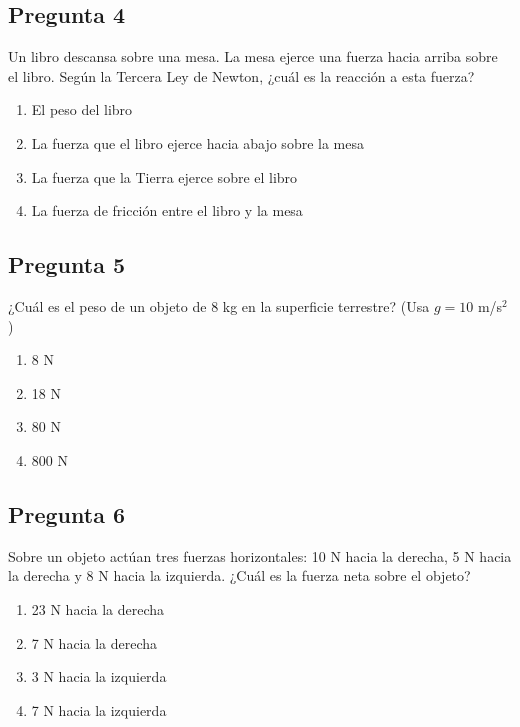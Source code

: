 \begin{preguntabox}
\subsection{Pregunta 4}
Un libro descansa sobre una mesa. La mesa ejerce una fuerza hacia arriba sobre el libro. Según la Tercera Ley de Newton, ¿cuál es la reacción a esta fuerza?

\begin{enumerate}
    \item[A)] El peso del libro
    \item[B)] La fuerza que el libro ejerce hacia abajo sobre la mesa
    \item[C)] La fuerza que la Tierra ejerce sobre el libro
    \item[D)] La fuerza de fricción entre el libro y la mesa
\end{enumerate}
\end{preguntabox}

\begin{preguntabox}
\subsection{Pregunta 5}
¿Cuál es el peso de un objeto de 8 kg en la superficie terrestre? (Usa $g = 10$ m/s$^2$)

\begin{enumerate}
    \item[A)] 8 N
    \item[B)] 18 N
    \item[C)] 80 N
    \item[D)] 800 N
\end{enumerate}
\end{preguntabox}

\newpage

\begin{preguntabox}
\subsection{Pregunta 6}
Sobre un objeto actúan tres fuerzas horizontales: 10 N hacia la derecha, 5 N hacia la derecha y 8 N hacia la izquierda. ¿Cuál es la fuerza neta sobre el objeto?

\begin{enumerate}
    \item[A)] 23 N hacia la derecha
    \item[B)] 7 N hacia la derecha
    \item[C)] 3 N hacia la izquierda
    \item[D)] 7 N hacia la izquierda
\end{enumerate}
\end{preguntabox}

